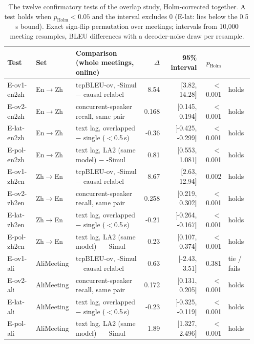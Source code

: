 \begin{table}[!t]
\centering\small
\setlength{\tabcolsep}{4pt}
\begin{tabular}{lllrrrl}
\toprule
Test & Set & Comparison (whole meetings, online) & $\Delta$ & 95\% interval & $p_\text{Holm}$ & \\
\midrule
E-ov1-en2zh & En$\rightarrow$Zh & tcpBLEU-ov, \sys{}-Simul $-$ causal relabel & 8.54 & [3.82, 14.28] & $<$0.001 & holds \\
E-ov2-en2zh & En$\rightarrow$Zh & concurrent-speaker recall, same pair & 0.168 & [0.145, 0.194] & $<$0.001 & holds \\
E-lat-en2zh & En$\rightarrow$Zh & text lag, overlapped $-$ single ($<$0.5\,s) & -0.36 & [-0.425, -0.299] & $<$0.001 & holds \\
E-pol-en2zh & En$\rightarrow$Zh & text lag, LA2 (same model) $-$ \sys{}-Simul & 0.81 & [0.553, 1.081] & $<$0.001 & holds \\
E-ov1-zh2en & Zh$\rightarrow$En & tcpBLEU-ov, \sys{}-Simul $-$ causal relabel & 8.67 & [2.63, 12.94] & 0.002 & holds \\
E-ov2-zh2en & Zh$\rightarrow$En & concurrent-speaker recall, same pair & 0.258 & [0.219, 0.302] & $<$0.001 & holds \\
E-lat-zh2en & Zh$\rightarrow$En & text lag, overlapped $-$ single ($<$0.5\,s) & -0.21 & [-0.264, -0.167] & $<$0.001 & holds \\
E-pol-zh2en & Zh$\rightarrow$En & text lag, LA2 (same model) $-$ \sys{}-Simul & 0.23 & [0.107, 0.374] & $<$0.001 & holds \\
E-ov1-ali & AliMeeting & tcpBLEU-ov, \sys{}-Simul $-$ causal relabel & 0.63 & [-2.43, 3.51] & 0.381 & tie / fails \\
E-ov2-ali & AliMeeting & concurrent-speaker recall, same pair & 0.172 & [0.131, 0.205] & $<$0.001 & holds \\
E-lat-ali & AliMeeting & text lag, overlapped $-$ single ($<$0.5\,s) & -0.23 & [-0.325, -0.119] & $<$0.001 & holds \\
E-pol-ali & AliMeeting & text lag, LA2 (same model) $-$ \sys{}-Simul & 1.89 & [1.327, 2.496] & $<$0.001 & holds \\
\bottomrule
\end{tabular}
\caption{The twelve confirmatory tests of the overlap study, Holm-corrected together. A test holds when $p_\text{Holm}<0.05$ and
the interval excludes 0 (E-lat: lies below the 0.5\,s bound). Exact sign-flip permutation over meetings; intervals from
10,000 meeting resamples, BLEU differences with a decoder-noise draw per resample.}
\label{tab:reg8}
\end{table}
